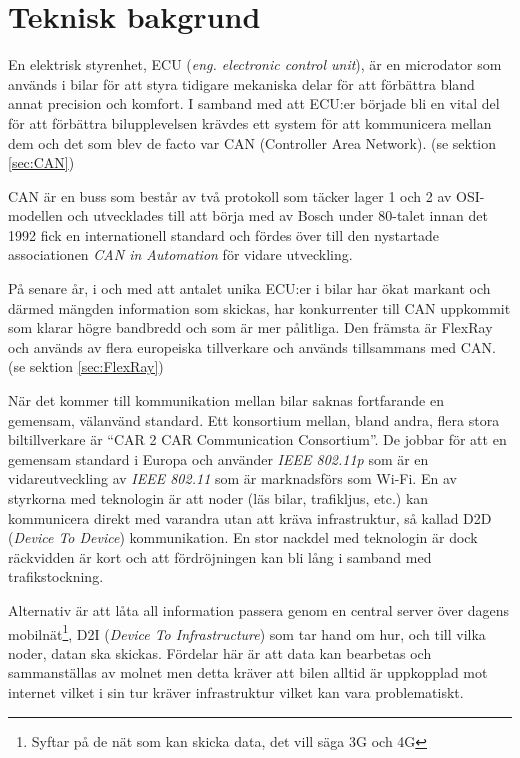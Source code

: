 \documentclass[a4paper]{IEEEtran}
\begin{document}
\section{Teknisk bakgrund}
En elektrisk styrenhet, ECU (\emph{eng. electronic control unit}), är en microdator som används i bilar för att styra tidigare mekaniska delar för att förbättra bland annat precision och komfort. 
I samband med att ECU:er började bli en vital del för att förbättra bilupplevelsen krävdes ett system för att kommunicera mellan dem och det som blev de facto var CAN (Controller Area Network). (se sektion \ref{sec:CAN})

CAN är en buss som består av två protokoll som täcker lager 1 och 2 av OSI-modellen och utvecklades till att börja med av Bosch under 80-talet innan det 1992 fick en internationell standard och fördes över till den nystartade associationen \emph{CAN in Automation} för vidare utveckling. \cite{CANhist}

På senare år, i och med att antalet unika ECU:er i bilar har ökat markant och därmed mängden information som skickas, har konkurrenter till CAN uppkommit som klarar högre bandbredd och som är mer pålitliga. Den främsta är FlexRay och används av flera europeiska tillverkare och används tillsammans med CAN. \cite{FlexRayWiki} (se sektion \ref{sec:FlexRay})

När det kommer till kommunikation mellan bilar saknas fortfarande en gemensam, välanvänd standard. Ett konsortium mellan, bland andra, flera stora biltillverkare är ``CAR 2 CAR Communication Consortium''. De jobbar för att en gemensam standard i Europa och använder \emph{IEEE 802.11p} som är en vidareutveckling av \emph{IEEE 802.11} som är marknadsförs som Wi-Fi. En av styrkorna med teknologin är att noder (läs bilar, trafikljus, etc.) kan kommunicera direkt med varandra utan att kräva infrastruktur, så kallad D2D (\emph{Device To Device}) kommunikation. En stor nackdel med teknologin är dock räckvidden är kort och att fördröjningen kan bli lång i samband med trafikstockning. \cite{C2COrg,C2CDepl,ericsson5G,5GPPP}

Alternativ är att låta all information passera genom en central server över dagens mobilnät\footnote{Syftar på de nät som kan skicka data, det vill säga 3G och 4G}, D2I (\emph{Device To Infrastructure}) som tar hand om hur, och till vilka noder, datan ska skickas. Fördelar här är att data kan bearbetas och sammanställas av molnet men detta kräver att bilen alltid är uppkopplad mot internet vilket i sin tur kräver infrastruktur vilket kan vara problematiskt. \cite{VolvoSRA}
\end{document}
